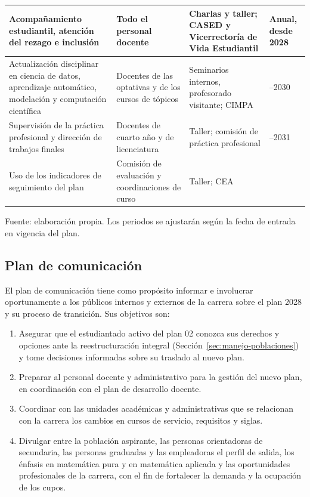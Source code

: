 \begin{longtable}{|>{\raggedright\arraybackslash}p{4.6cm}|>{\raggedright\arraybackslash}p{3.3cm}|>{\raggedright\arraybackslash}p{3.6cm}|>{\centering\arraybackslash}p{2.3cm}|}
Acompañamiento estudiantil, atención del rezago e inclusión & Todo el personal docente & Charlas y taller; CASED y Vicerrectoría de Vida Estudiantil & Anual, desde 2028 \\ \hline
Actualización disciplinar en ciencia de datos, aprendizaje automático, modelación y computación científica & Docentes de las optativas y de los cursos de tópicos & Seminarios internos, profesorado visitante; CIMPA & 2029--2030 \\ \hline
Supervisión de la práctica profesional y dirección de trabajos finales & Docentes de cuarto año y de licenciatura & Taller; comisión de práctica profesional & 2030--2031 \\ \hline
Uso de los indicadores de seguimiento del plan & Comisión de evaluación y coordinaciones de curso & Taller; CEA & 2029 \\ \hline
\end{longtable}
%
\vspace{-0.8\baselineskip}
{\footnotesize Fuente: elaboración propia. Los periodos se ajustarán según la fecha de entrada en vigencia del plan.\par}
\endgroup
\medskip

\subsection{Plan de comunicación}
\label{sec:plan-comunicacion}

El plan de comunicación tiene como propósito informar e involucrar oportunamente a los públicos internos y externos de la carrera sobre el plan 2028 y su proceso de transición. Sus objetivos son:

\begin{enumerate}
    \item Asegurar que el estudiantado activo del plan 02 conozca sus derechos y opciones ante la reestructuración integral (Sección~\ref{sec:manejo-poblaciones}) y tome decisiones informadas sobre su traslado al nuevo plan.
    \item Preparar al personal docente y administrativo para la gestión del nuevo plan, en coordinación con el plan de desarrollo docente.
    \item Coordinar con las unidades académicas y administrativas que se relacionan con la carrera los cambios en cursos de servicio, requisitos y siglas.
    \item Divulgar entre la población aspirante, las personas orientadoras de secundaria, las personas graduadas y las empleadoras el perfil de salida, los énfasis en matemática pura y en matemática aplicada y las oportunidades profesionales de la carrera, con el fin de fortalecer la demanda y la ocupación de los cupos.
\end{enumerate}

